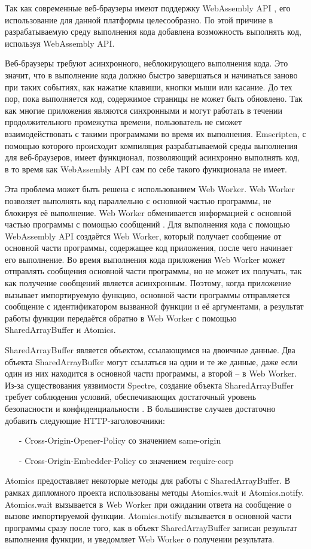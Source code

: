 Так как современные веб-браузеры имеют поддержку WebAssembly API \cite{WasmBrowserSupport}, его использование для данной платформы целесообразно.
По этой причине в разрабатываемую среду выполнения кода добавлена возможность выполнять код, используя WebAssembly API.

Веб-браузеры требуют асинхронного, неблокирующего выполнения кода. 
Это значит, что в выполнение кода должно быстро завершаться и начинаться заново при таких событиях, как нажатие клавиши, кнопки мыши или касание.
До тех пор, пока выполняется код, содержимое страницы не может быть обновлено.
Так как многие приложения являются синхронными и могут работать в течении продолжительного промежутка времени, пользователь не сможет взаимодействовать с такими программами во время их выполнения.
Emscripten, с помощью которого происходит компиляция разрабатываемой среды выполнения для веб-браузеров, имеет функционал, позволяющий асинхронно выполнять код, в то время как WebAssembly API сам по себе такого функционала не имеет.

Эта проблема может быть решена с использованием Web Worker.
Web Worker позволяет выполнять код параллельно с основной частью программы, не блокируя её выполнение.
Web Worker обменивается информацией с основной частью программы с помощью сообщений \cite{WebWorkerMessages}.
Для выполнения кода с помощью WebAssembly API создаётся Web Worker, который получает сообщение от основной части программы, содержащее код приложения, после чего начинает его выполнение.
Во время выполнения кода приложения Web Worker может отправлять сообщения основной части программы, но не может их получать, так как получение сообщений является асинхронным.
Поэтому, когда приложение вызывает импортируемую функцию, основной части программы отправляется сообщение с идентификатором вызванной функции и её аргументами, а результат работы функции передаётся обратно в Web Worker с помощью SharedArrayBuffer и Atomics.

SharedArrayBuffer является объектом, ссылающимся на двоичные данные.
Два объекта SharedArrayBuffer могут ссылаться на одни и те же данные, даже если один из них находится в основной части программы, а второй -- в Web Worker.
Из-за существования уязвимости Spectre, создание объекта SharedArrayBuffer требует соблюдения условий, обеспечивающих достаточный уровень безопасности и конфиденциальности \cite{SharedArrayBuffer}. В большинстве случаев достаточно добавить следующие HTTP-заголовочники:
\begin{itemize}
    \item[-] Cross-Origin-Opener-Policy со значением same-origin 
    \item[-] Cross-Origin-Embedder-Policy со значением require-corp
\end{itemize}

Atomics предоставляет некоторые методы для работы с SharedArrayBuffer.
В рамках дипломного проекта использованы методы Atomics.wait и Atomics.notify.
Atomics.wait вызывается в Web Worker при ожидании ответа на сообщение о вызове импортируемой функции.
Atomics.notify вызывается в основной части программы сразу после того, как в объект SharedArrayBuffer записан результат выполнения функции, и уведомляет Web Worker о получении результата.

